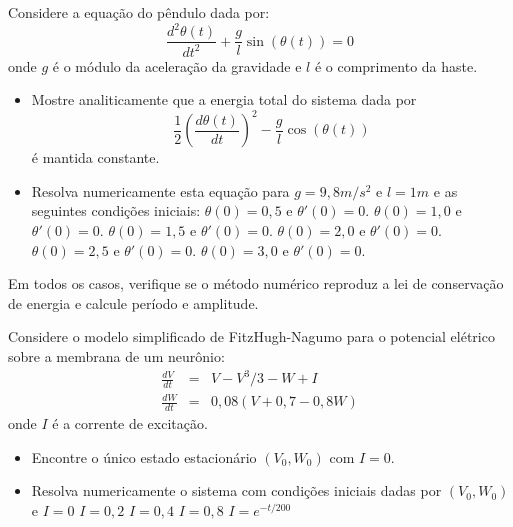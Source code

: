 \begin{exer} Considere a equação do pêndulo dada por:
$$\frac{d^2\theta(t)}{dt^2}+\frac{g}{l}\sin(\theta(t))=0$$
onde $g$ é o módulo da aceleração da gravidade e $l$ é o comprimento da haste.
\begin{itemize}
\item Mostre analiticamente que a energia total do sistema dada por
$$\frac{1}{2}\left(\frac{d\theta(t)}{dt}\right)^2-\frac{g}{l}\cos(\theta(t))$$
é mantida constante.
\item Resolva numericamente esta equação para $g=9,8m/s^2$ e $l=1m$ e as seguintes condições iniciais:
\subitem $\theta(0)=0,5$ e $\theta'(0)=0$.
\subitem $\theta(0)=1,0$ e $\theta'(0)=0$.
\subitem $\theta(0)=1,5$ e $\theta'(0)=0$.
\subitem $\theta(0)=2,0$ e $\theta'(0)=0$.
\subitem $\theta(0)=2,5$ e $\theta'(0)=0$.
\subitem $\theta(0)=3,0$ e $\theta'(0)=0$.
\end{itemize}
Em todos os casos, verifique se o método numérico reproduz a lei de conservação de energia e calcule período e amplitude.
\end{exer}

\begin{exer} Considere o modelo simplificado de FitzHugh-Nagumo para o potencial elétrico sobre a membrana de um neurônio:
\begin{eqnarray*}
\frac{d V}{dt}& = &  V-V^3/3 - W +  I  \\
\frac{d W}{dt} & = & 0,08(V+0,7 - 0,8W)
\end{eqnarray*}
onde $I$ é a corrente de excitação.
\begin{itemize}
\item Encontre o único estado estacionário $\left(V_0,W_0\right)$ com $I=0$.
\item Resolva numericamente o sistema com condições iniciais dadas por $\left(V_0,W_0\right)$ e
\subitem $I=0$
\subitem $I=0,2$
\subitem $I=0,4$
\subitem $I=0,8$
\subitem $I=e^{-t/200}$
\end{itemize}
\end{exer}


